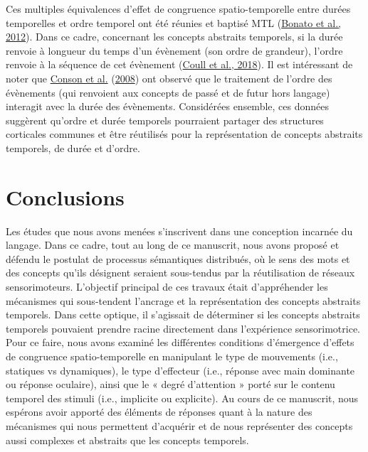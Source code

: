 \documentclass[
  a4paper,12pt,twoside,onecolumn,openright,final,oldfontcommands]{memoir}
\begin{document}
Ces multiples équivalences d'effet de congruence spatio-temporelle entre durées temporelles et ordre temporel ont été réunies et baptisé MTL (\protect\hyperlink{ref-bonato_when_2012}{Bonato et al., 2012}). Dans ce cadre, concernant les concepts abstraits temporels, si la durée renvoie à longueur du temps d'un évènement (son ordre de grandeur), l'ordre renvoie à la séquence de cet évènement (\protect\hyperlink{ref-coull_mental_2018}{Coull et al., 2018}). Il est intéressant de noter que \protect\hyperlink{ref-conson_common_2008}{Conson et al.} (\protect\hyperlink{ref-conson_common_2008}{2008}) ont observé que le traitement de l'ordre des évènements (qui renvoient aux concepts de passé et de futur hors langage) interagit avec la durée des évènements. Considérées ensemble, ces données suggèrent qu'ordre et durée temporels pourraient partager des structures corticales communes et être réutilisés pour la représentation de concepts abstraits temporels, de durée et d'ordre.

\hypertarget{conclusions}{%
\section{Conclusions}\label{conclusions}}

Les études que nous avons menées s'inscrivent dans une conception incarnée du langage. Dans ce cadre, tout au long de ce manuscrit, nous avons proposé et défendu le postulat de processus sémantiques distribués, où le sens des mots et des concepts qu'ils désignent seraient sous-tendus par la réutilisation de réseaux sensorimoteurs. L'objectif principal de ces travaux était d'appréhender les mécanismes qui sous-tendent l'ancrage et la représentation des concepts abstraits temporels. Dans cette optique, il s'agissait de déterminer si les concepts abstraits temporels pouvaient prendre racine directement dans l'expérience sensorimotrice. Pour ce faire, nous avons examiné les différentes conditions d'émergence d'effets de congruence spatio-temporelle en manipulant le type de mouvements (i.e., statiques vs dynamiques), le type d'effecteur (i.e., réponse avec main dominante ou réponse oculaire), ainsi que le « degré d'attention » porté sur le contenu temporel des stimuli (i.e., implicite ou explicite). Au cours de ce manuscrit, nous espérons avoir apporté des éléments de réponses quant à la nature des mécanismes qui nous permettent d'acquérir et de nous représenter des concepts aussi complexes et abstraits que les concepts temporels.
\end{document}
